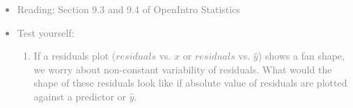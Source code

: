 \documentclass[11pt]{article}
\newcommand{\gray}[1]{\textcolor{gray}{#1}}
\begin{document}
\gray{
{\it
\vspace{-0.55cm}
\begin{itemize}
\renewcommand{\labelitemi}{{\textcolor{dark}{$\ast$}}}
\item Reading: Section 9.3 and 9.4 of OpenIntro Statistics
\item Test yourself:
\begin{enumerate}
\item If a residuals plot ($residuals$ vs. $x$ or $residuals$ vs. $\hat{y}$) shows a fan shape, we worry about non-constant variability of residuals. What would the shape of these residuals look like if absolute value of residuals are plotted against a predictor or $\hat{y}$.
\end{enumerate}
\end{itemize}
}}
\end{document}
